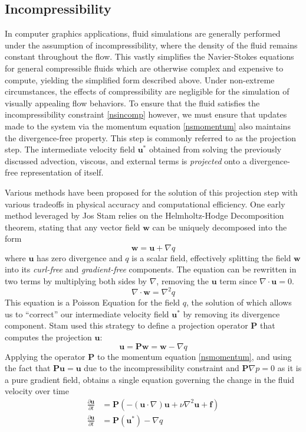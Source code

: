 \documentclass[a4paper, 11pt, titlepage]{article}
\renewcommand\i[1]{\textit{#1}}%
\begin{document}
\subsection{Incompressibility}
In computer graphics applications, fluid simulations are generally performed under the
assumption of incompressibility, where the density of the fluid remains constant
throughout the flow. This vastly simplifies the
Navier-Stokes equations for general compressible fluids which are otherwise
complex and expensive to compute, yielding the simplified form described
above. Under non-extreme circumstances, the
effects of compressibility are negligible for the simulation of visually
appealing flow behaviors. To ensure that the fluid satisfies the
incompressibility constraint \eqref{nsincomp} however, we must ensure that
updates made to the system via the momentum equation \eqref{nsmomentum} also
maintains the divergence-free property. This step is commonly referred to as the
projection step. The intermediate velocity field $\bm{u}^*$ obtained from
solving the previously discussed advection, viscous, and external terms is \i{projected} onto a
divergence-free representation of itself.

Various methods have been proposed for the solution of this projection step with
various tradeoffs in physical accuracy and computational efficiency. One early method
leveraged by Jos Stam \cite{stam2003real} relies on the Helmholtz-Hodge Decomposition theorem,
stating that any vector field $\bm{w}$ can be uniquely decomposed
into the form
\begin{equation}
    \bm{w} = \bm{u} + \nabla q
\end{equation}
where $\bm{u}$ has zero divergence and $q$ is a scalar field, effectively
splitting the field $\bm{w}$ into its \i{curl-free} and \i{gradient-free} components. The
equation can be rewritten in two terms by multiplying both sides by $\nabla$, removing
the $\bm{u}$ term since $\nabla \cdot \bm{u} = 0$.
\begin{equation}\label{poisson}
    \nabla \cdot \bm{w} = \nabla^2 q
\end{equation}
This equation is a Poisson Equation for the field $q$, the solution of which
allows us to ``correct'' our intermediate velocity field $\bm{u}^*$ by removing
its divergence component. Stam used this strategy to define a projection
operator $\bm{P}$ that computes the projection $\bm{u}$:
$$
    \bm{u} = \bm{P}\bm{w} = \bm{w} - \nabla q
$$
Applying the operator $\bm{P}$ to the momentum equation \eqref{nsmomentum}, and
using the fact that $\bm{P}\bm{u} = \bm{u}$ due to the incompressibility constraint
and $\bm{P}\nabla p = 0$ as it is a pure gradient field,
obtains a single equation governing the change in the fluid velocity over
time
\begin{equation}
\begin{aligned}
    \frac{\partial \bm{u}}{\partial t} &= \bm{P}\left(-(\bm{u} \cdot \nabla)\bm{u} + \nu\nabla^2\bm{u} + \bm{f}\right) \\
    \frac{\partial \bm{u}}{\partial t} &= \bm{P}\left(\bm{u}^*\right) - \nabla q \\
\end{aligned}
\end{equation}
\end{document}
